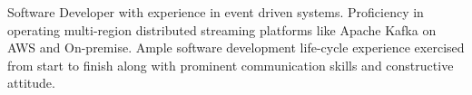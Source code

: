 

\begin{cvparagraph}

Software Developer with experience in event driven systems. Proficiency in operating multi-region distributed streaming platforms like Apache Kafka on AWS and On-premise. Ample software development life-cycle experience exercised from start to finish along with prominent communication skills and constructive attitude.
\end{cvparagraph}
